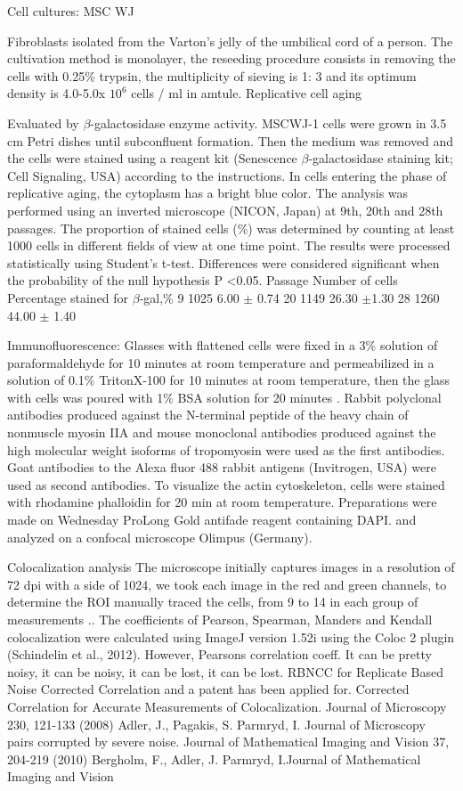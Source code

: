 \documentclass[a4paper,12pt]{article}
\begin{document}
Cell cultures: MSC WJ

Fibroblasts isolated from the Varton's jelly of the umbilical cord of a person.
The cultivation method is monolayer, the reseeding procedure consists in removing the cells with 0.25\% trypsin, the multiplicity of sieving is 1: 3 and its optimum density is 4.0-5.0x $10 ^ 6$ cells / ml in amtule.
Replicative cell aging

Evaluated by $\beta$-galactosidase enzyme activity. MSCWJ-1 cells were grown in 3.5 cm Petri dishes until subconfluent formation.
Then the medium was removed and the cells were stained using a reagent kit (Senescence $\beta$-galactosidase staining kit; Cell Signaling, USA) according to the instructions. In cells entering the phase of replicative aging, the cytoplasm has a bright blue color. The analysis was performed using an inverted microscope (NICON, Japan) at 9th, 20th and 28th passages. The proportion of stained cells (\%) was determined by counting at least 1000 cells in different fields of view at one time point. The results were processed statistically using Student's t-test. Differences were considered significant when the probability of the null hypothesis P <0.05.
Passage Number of cells Percentage stained for $\beta$-gal,\%
9 1025 6.00 $\pm$ 0.74
20 1149 26.30 $\pm$1.30
28 1260 44.00 $\pm$ 1.40

Immunofluorescence:
Glasses with flattened cells were fixed in a 3\% solution of paraformaldehyde for 10 minutes at room temperature and permeabilized in a solution of 0.1\% TritonX-100 for 10 minutes at room temperature, then the glass with cells was poured with 1\% BSA solution for 20 minutes . Rabbit polyclonal antibodies produced against the N-terminal peptide of the heavy chain of nonmuscle myosin IIA and mouse monoclonal antibodies produced against the high molecular weight isoforms of tropomyosin were used as the first antibodies. Goat antibodies to the Alexa fluor 488 rabbit antigens (Invitrogen, USA) were used as second antibodies. To visualize the actin cytoskeleton, cells were stained with rhodamine phalloidin for 20 min at room temperature. Preparations were made on Wednesday ProLong Gold antifade reagent containing DAPI. and analyzed on a confocal microscope Olimpus (Germany).

Colocalization analysis
The microscope initially captures images in a resolution of 72 dpi with a side of 1024, we took each image in the red and green channels, to determine the ROI manually traced the cells, from 9 to 14 in each group of measurements ..
The coefficients of Pearson, Spearman, Manders and Kendall colocalization were calculated using ImageJ version 1.52i using the Coloc 2 plugin (Schindelin et al., 2012).
However, Pearsons correlation coeff. It can be pretty noisy, it can be noisy, it can be lost, it can be lost. RBNCC for Replicate Based Noise Corrected Correlation and a patent has been applied for. Corrected Correlation for Accurate Measurements of Colocalization. Journal of Microscopy 230, 121-133 (2008) Adler, J., Pagakis, S.  Parmryd, I. Journal of Microscopy pairs corrupted by severe noise.
Journal of Mathematical Imaging and Vision 37, 204-219 (2010) Bergholm, F., Adler, J.  Parmryd, I.Journal of Mathematical Imaging and Vision
\end{document}
